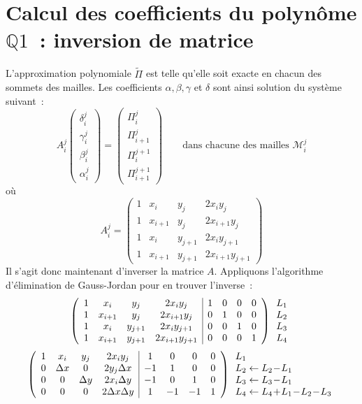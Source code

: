 \documentclass[main.tex]{subfiles}
\begin{document}
\section{Calcul des coefficients du polynôme $\mathbb{Q}1$~: inversion de matrice}
L'approximation polynomiale $\tilde{\Pi}$ est telle qu'elle soit exacte en chacun des sommets des mailles. Les coefficients $\alpha, \beta, \gamma$ et $\delta$ sont ainsi solution du système suivant~:
\begin{equation}
A_i^j\begin{pmatrix}
\delta_i^j \\  \gamma_i^j \\ \beta_i^j \\ \alpha_i^j
\end{pmatrix}
= \begin{pmatrix}
\Pi_i^j \\ \Pi_{i+1}^j \\ \Pi_i^{j+1} \\ \Pi_{i+1}^{j+1}
\end{pmatrix} \qquad \textrm{dans chacune des mailles~} \mathcal{M}_i^j
\end{equation}
où
\begin{equation}
A_i^j=
\begin{pmatrix}
1 & x_i & y_j & 2 x_i y_j \\
1 & x_{i+1}  & y_j & 2x_{i +1} y_j \\
1 & x_i  & y_{j+ 1} & 2x_i  y_{j + 1} \\
1 & x_{i + 1} & y_{j+1} & 2x_{i +1} y_{j + 1}
\end{pmatrix}
\end{equation}
Il s'agit donc maintenant d'inverser la matrice $A$. 
Appliquons l'algorithme d'élimination de Gauss-Jordan pour en trouver l'inverse~:
$$\medmuskip=1mu \left(
\begin{array}{cccc|cccc}
1 & x_i & y_j & 2 x_i y_j & 1 & 0 & 0 & 0\\
1 & x_{i+1} & y_j & 2x_{i +1} y_j  & 0 & 1 & 0 & 0\\
1 & x_i  & y_{j+1} & 2x_i  y_{j +1} & 0 & 0 & 1 & 0 \\
1 & x_{i +1} & y_{j +1}& 2x_{i +1} y_{j +1}& 0 & 0 & 0 & 1
\end{array}\right) \begin{array}{l}
L_1 \\ L_2 \\ L_3 \\ L_4
\end{array}  $$ 
$$\medmuskip=1mu \left(
\begin{array}{cccc|cccc}
1 & x_i & y_j & 2 x_i y_j & 1 & 0 & 0 & 0\\
0 &  \Delta x & 0 & 2 y_j\Delta x   & -1 & 1 & 0 & 0\\
0 & 0  &  \Delta y & 2x_i \Delta y & -1 & 0 & 1 & 0 \\
0 & 0 & 0 & 2 \Delta x \Delta y & 1 & -1 & -1 & 1
\end{array}\right) \begin{array}{l}
L_1 \\
L_2 \leftarrow L_2 - L_1 \\
L_3 \leftarrow L_3- L_1 \\
L_4 \leftarrow  L_4 + L_1 - L_2 - L_3
\end{array} $$
\end{document}
